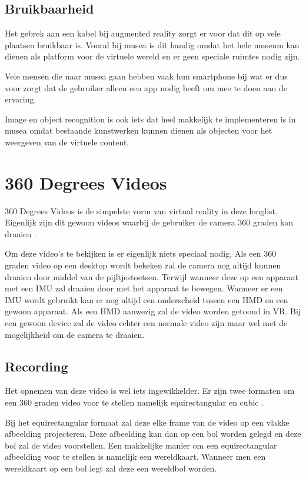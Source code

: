 \subsection{Bruikbaarheid}
Het gebrek aan een kabel bij augmented reality zorgt er voor dat dit op vele plaatsen bruikbaar is. Vooral bij musea is dit handig omdat het hele museum kan dienen als platform voor de virtuele wereld en er geen speciale ruimtes nodig zijn.

Vele mensen die naar musea gaan hebben vaak hun smartphone bij wat er dus voor zorgt dat de gebruiker alleen een app nodig heeft om mee te doen aan de ervaring.

Image en object recognition is ook iets dat heel makkelijk te implementeren is in musea omdat bestaande kunstwerken kunnen dienen als objecten voor het weergeven van de virtuele content.

\section{360 Degrees Videos}
360 Degrees Videos is de simpelste vorm van virtual reality in deze longlist. Eigenlijk zijn dit gewoon videos waarbij de gebruiker de camera 360 graden kan draaien \autocite{Hosseini2016}.

Om deze video's te bekijken is er eigenlijk niets speciaal nodig. Als een 360 graden video op een desktop wordt bekeken zal de camera nog altijd kunnen draaien door middel van de pijltjestoetsen. Terwijl wanneer deze op een apparaat met een IMU zal draaien door met het apparaat te bewegen. Wanneer er een IMU wordt gebruikt kan er nog altijd een onderscheid tussen een HMD en een gewoon apparaat. Als een HMD aanwezig zal de video worden getoond in VR. Bij een gewoon device zal de video echter een normale video zijn maar wel met de mogelijkheid om de camera te draaien.

\subsection{Recording}
Het opnemen van deze video is wel iets ingewikkelder. Er zijn twee formaten om een 360 graden video voor te stellen namelijk equirectangular en cubic \autocite{Lee2010}. 

Bij het equirectangular formaat zal deze elke frame van de video op een vlakke afbeelding projecteren. Deze afbeelding kan dan op een bol worden gelegd en deze bol zal de video voorstellen. Een makkelijke manier om een equirectangular afbeelding voor te stellen is namelijk een wereldkaart. Wanneer men een wereldkaart op een bol legt zal deze een wereldbol worden.
 
